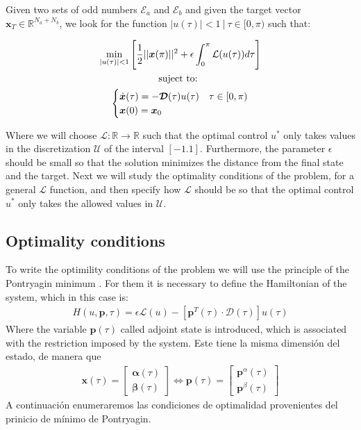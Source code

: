 \begin{problem}\label{OCP2}
    Given two sets of odd numbers $ \mathcal {E} _a $ and $ \mathcal {E} _b $ and given the target vector $ \bm {x} _T \in \mathbb {R} ^ {N_a + N_b} $, we look for the function $ |u (\tau)|<1 \ | \ \tau \in [0, \pi) $ such that:

    \begin{gather}
        \min_{|u(\tau) |<1}         
         \Bigg[ \frac{1}{2}|| \bm{x}(\pi)  ||^2  
        + \epsilon \int_0^{\pi} \mathcal{L}(u(\tau)) d\tau \Bigg]  \\
        \notag \text{suject to: } \\
        \begin{cases}
            \dot{\bm{x}}(\tau) = -\bm{\mathcal{D}}(\tau) u(\tau)  & \tau \in [0,\pi)\\
            \bm{x}(0) = \bm{x}_0
        \end{cases}
    \end{gather}
\end{problem}
Where we will choose $ \mathcal {L}: \mathbb {R} \rightarrow \mathbb {R} $ such that the optimal control $ u^* $ only takes values in the discretization $ \mathcal {U} $ of the interval $ [- 1.1] $. Furthermore, the parameter $ \epsilon $ should be small so that the solution minimizes the distance from the final state and the target.
%
Next we will study the optimality conditions of the problem, for a general $ \mathcal {L} $ function, and then specify how $ \mathcal {L} $ should be so that the optimal control $ u ^ * $ only takes the allowed values in $ \mathcal {U} $.

\subsection{Optimality conditions}

To write the optimility conditions of the problem we will use the principle of the Pontryagin minimum \cite[Chapter~2.7]{bryson1975applied}. For them it is necessary to define the Hamiltonian of the system, which in this case is:
\begin{gather}\label{hamil}
    H(u,\bm{p},\tau) = 
    \epsilon \mathcal{L}(u) -
    [\bm{p}^T(\tau) \cdot \bm{\mathcal{D}}(\tau)]
    u(\tau)
\end{gather}
Where the variable $ \bm{p} (\tau) $ called adjoint state is introduced, which is associated with the restriction imposed by the system. Este tiene la misma dimensión del estado, de manera que 
\begin{gather}
        \bm{x}(\tau) = \begin{bmatrix}
            \bm{\alpha}(\tau) \\  \bm{\beta}(\tau)
        \end{bmatrix}   \Leftrightarrow
        \bm{p}(\tau) = \begin{bmatrix}
        \bm{p}^\alpha(\tau) \\ \bm{p}^\beta(\tau)
                \end{bmatrix}
\end{gather}
A continuación enumeraremos las condiciones de optimalidad provenientes del prinicio de mínimo de Pontryagin.

